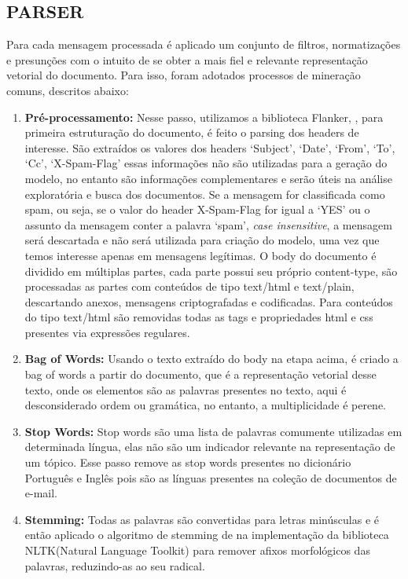 \documentclass[12pt,a4paper]{article}
\begin{document}
  
  \subsection{PARSER}
  Para cada mensagem processada é aplicado um conjunto de filtros, normatizações e presunções com o intuito de se obter a mais fiel e relevante representação vetorial do documento.
   Para isso, foram adotados processos de mineração comuns, descritos abaixo:
  
  \begin{enumerate}
  \item \textbf{Pré-processamento:} Nesse passo, utilizamos a biblioteca Flanker, , para primeira estruturação do documento, é feito o parsing dos headers de interesse.
   São extraídos os valores dos headers ‘Subject’, ‘Date’, ‘From’, ‘To’, ‘Cc’, ‘X-Spam-Flag’ essas informações não são utilizadas para a geração do modelo,
   no entanto são informações complementares e serão úteis na análise exploratória e busca dos documentos. Se a mensagem for classificada como spam, ou seja, 
   se o valor do header X-Spam-Flag for igual a ‘YES’ ou o assunto da mensagem conter a palavra ‘spam’, \textit{case insensitive}, a mensagem será descartada e não será utilizada para criação do modelo,
   uma vez que temos interesse apenas em mensagens legítimas. O body do documento é dividido em múltiplas partes, cada parte possui seu próprio content-type,
   são processadas as partes com conteúdos de tipo text/html e text/plain, descartando anexos, mensagens criptografadas e codificadas. 
   Para conteúdos do tipo text/html são removidas todas as tags e propriedades html e css presentes via expressões regulares.
  \item \textbf{Bag of Words:} Usando o texto extraído do body na etapa acima, é criado a bag of words a partir do documento, que é a representação vetorial desse texto,
   onde os elementos são as palavras presentes no texto, aqui é desconsiderado ordem ou gramática, no entanto, a multiplicidade é perene.
  \item \textbf{Stop Words:} Stop words são uma lista de palavras comumente utilizadas em determinada língua, elas não são um indicador relevante na representação de um tópico.
   Esse passo remove as stop words presentes no dicionário Português e Inglês pois são as línguas presentes na coleção de documentos de e-mail.
  \item \textbf{Stemming:} Todas as palavras são convertidas para letras minúsculas e é então aplicado o algoritmo de stemming de 
   na implementação da biblioteca NLTK(Natural Language Toolkit)  para remover afixos morfológicos das palavras, reduzindo-as ao seu radical.
  

\end{enumerate}
\end{document}
